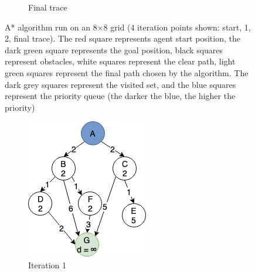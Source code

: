 \begin{figure}[h!]
\begin{subfigure}[b]{0.2\linewidth}
    \caption{Final trace}
  \end{subfigure}
  \caption{A* algorithm run on an 8$\times$8 grid (4 iteration points shown: start, 1, 2, final trace). The red square represents agent start position, the dark green square represents the goal position, black squares represent obstacles, white squares represent the clear path, light green squares represent the final path chosen by the algorithm. The dark grey squares represent the visited set, and the blue squares represent the priority queue (the darker the blue, the higher the priority)}
  \label{fig:a_star}
\end{figure}

\begin{figure}[h!]
  \centering
  \begin{subfigure}[b]{0.2\linewidth}
    \includegraphics[width=\linewidth]{images/a_star_expansion1.png}
     \caption{Iteration 1}
  \end{subfigure}
  \hfill
  \begin{subfigure}[b]{0.2\linewidth}

\end{subfigure}
\end{figure}
